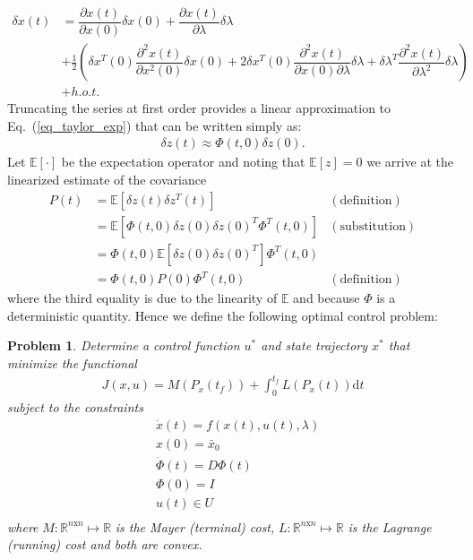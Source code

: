 \documentclass[10pt,a4paper]{article}
\begin{document}
	\begin{align}
	\delta x(t) &= \dfrac{\partial x(t)}{\partial x(0)} \delta x(0) + \dfrac{\partial x(t)}{\partial \lambda} \delta \lambda \nonumber\\
	&+\frac{1}{2}\left(\delta x^T(0) \dfrac{\partial^2 x(t)}{\partial x^2(0)} \delta x(0) + 2\delta x^T(0)\dfrac{\partial^2 x(t)}{\partial x(0)\partial\lambda} \delta \lambda +\delta \lambda^T \dfrac{\partial^2 x(t)}{\partial \lambda^2} \delta \lambda\right) \label{eq_taylor_exp}\\
	\nonumber &+ h.o.t.
	\end{align}
	Truncating the series at first order provides a linear approximation to Eq.~(\ref{eq_taylor_exp}) that can be written simply as:
	\begin{align}
	\delta z(t) \approx \Phi(t,0)\delta z(0).
	\end{align}
	Let $\mathbb{E}[\cdot]$ be the expectation operator and noting that $\mathbb{E}[z]=0$ we arrive at the linearized estimate of the covariance
	\begin{align}
	P(t) &= \mathbb{E}[\delta z(t)\delta z^T(t)] &\mathrm{ (definition)} \\
	     &= \mathbb{E}[\Phi(t,0)\delta z(0)\delta z(0)^T\Phi^T(t,0)] &\mathrm{(substitution)} \\
	     &= \Phi(t,0)\mathbb{E}[\delta z(0)\delta z(0)^T] \Phi^T(t,0) \\
	     &= \Phi(t,0)P(0)\Phi^T(t,0) &\mathrm{ (definition)}
	\end{align}
	where the third equality is due to the linearity of $\mathbb{E}$ and because $\Phi$ is a deterministic quantity. Hence we define the following optimal control problem:
	
	\textbf{Problem 1}. \textit{Determine a control function $ u^* $ and state trajectory $ x^* $ that minimize the functional}
	\begin{align}
	J(x,u) = M(P_x(t_f)) + \int_{0}^{t_f}L(P_x(t))\mathrm{d}t
	\end{align}
	\textit{	subject to the constraints }
	\begin{align}
	&\dot{x}(t) = f(x(t),u(t),\lambda) \\
	&x(0) = \bar{x}_0 \\
	&\dot{\Phi}(t) = D\Phi(t) \\
	&\Phi(0) = I \\
	&u(t) \in U \\
	\end{align}
	\textit{where} $ M:\mathbb{R}^{n\mathrm{x}n}\mapsto \mathbb{R} $ \textit{is the Mayer (terminal) cost,}  $L:\mathbb{R}^{n\mathrm{x}n}\mapsto\mathbb{R}$ \textit{ is the Lagrange (running) cost and both are convex.}
	
\end{document}
